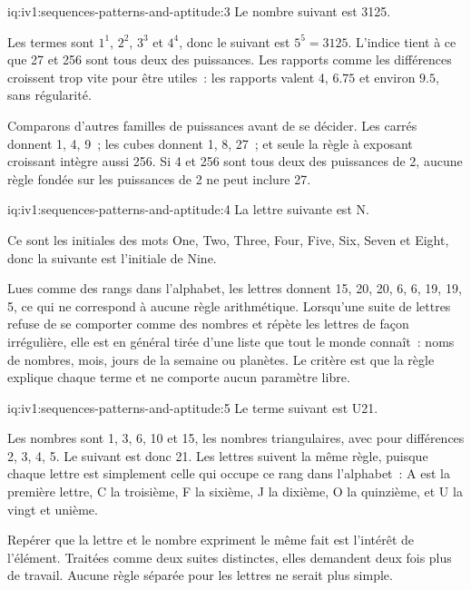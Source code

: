 \begin{solution}{iq:iv1:sequences-patterns-and-aptitude:3}
Le nombre suivant est 3125.

Les termes sont $1^1$, $2^2$, $3^3$ et $4^4$, donc le suivant est $5^5 = 3125$. L'indice tient à ce que 27 et 256 sont tous deux des puissances. Les rapports comme les différences croissent trop vite pour être utiles~: les rapports valent 4, $6.75$ et environ $9.5$, sans régularité.

Comparons d'autres familles de puissances avant de se décider. Les carrés donnent 1, 4, 9~; les cubes donnent 1, 8, 27~; et seule la règle à exposant croissant intègre aussi 256. Si 4 et 256 sont tous deux des puissances de 2, aucune règle fondée sur les puissances de 2 ne peut inclure 27.

\end{solution}

\begin{solution}{iq:iv1:sequences-patterns-and-aptitude:4}
La lettre suivante est N.

Ce sont les initiales des mots One, Two, Three, Four, Five, Six, Seven et Eight, donc la suivante est l'initiale de Nine.

Lues comme des rangs dans l'alphabet, les lettres donnent 15, 20, 20, 6, 6, 19, 19, 5, ce qui ne correspond à aucune règle arithmétique. Lorsqu'une suite de lettres refuse de se comporter comme des nombres et répète les lettres de façon irrégulière, elle est en général tirée d'une liste que tout le monde connaît~: noms de nombres, mois, jours de la semaine ou planètes. Le critère est que la règle explique chaque terme et ne comporte aucun paramètre libre.

\end{solution}

\begin{solution}{iq:iv1:sequences-patterns-and-aptitude:5}
Le terme suivant est U21.

Les nombres sont 1, 3, 6, 10 et 15, les nombres triangulaires, avec pour différences 2, 3, 4, 5. Le suivant est donc 21. Les lettres suivent la même règle, puisque chaque lettre est simplement celle qui occupe ce rang dans l'alphabet~: A est la première lettre, C la troisième, F la sixième, J la dixième, O la quinzième, et U la vingt et unième.

Repérer que la lettre et le nombre expriment le même fait est l'intérêt de l'élément. Traitées comme deux suites distinctes, elles demandent deux fois plus de travail. Aucune règle séparée pour les lettres ne serait plus simple.

\end{solution}

